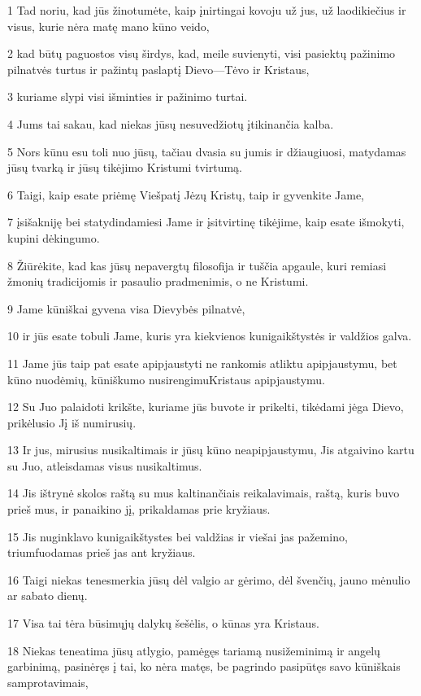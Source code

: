 \par 1 Tad noriu, kad jūs žinotumėte, kaip įnirtingai kovoju už jus, už laodikiečius ir visus, kurie nėra matę mano kūno veido, 
\par 2 kad būtų paguostos visų širdys, kad, meile suvienyti, visi pasiektų pažinimo pilnatvės turtus ir pažintų paslaptį Dievo—Tėvo ir Kristaus, 
\par 3 kuriame slypi visi išminties ir pažinimo turtai. 
\par 4 Jums tai sakau, kad niekas jūsų nesuvedžiotų įtikinančia kalba. 
\par 5 Nors kūnu esu toli nuo jūsų, tačiau dvasia su jumis ir džiaugiuosi, matydamas jūsų tvarką ir jūsų tikėjimo Kristumi tvirtumą. 
\par 6 Taigi, kaip esate priėmę Viešpatį Jėzų Kristų, taip ir gyvenkite Jame, 
\par 7 įsišakniję bei statydindamiesi Jame ir įsitvirtinę tikėjime, kaip esate išmokyti, kupini dėkingumo. 
\par 8 Žiūrėkite, kad kas jūsų nepavergtų filosofija ir tuščia apgaule, kuri remiasi žmonių tradicijomis ir pasaulio pradmenimis, o ne Kristumi. 
\par 9 Jame kūniškai gyvena visa Dievybės pilnatvė, 
\par 10 ir jūs esate tobuli Jame, kuris yra kiekvienos kunigaikštystės ir valdžios galva. 
\par 11 Jame jūs taip pat esate apipjaustyti ne rankomis atliktu apipjaustymu, bet kūno nuodėmių, kūniškumo nusirengimu­Kristaus apipjaustymu. 
\par 12 Su Juo palaidoti krikšte, kuriame jūs buvote ir prikelti, tikėdami jėga Dievo, prikėlusio Jį iš numirusių. 
\par 13 Ir jus, mirusius nusikaltimais ir jūsų kūno neapipjaustymu, Jis atgaivino kartu su Juo, atleisdamas visus nusikaltimus. 
\par 14 Jis ištrynė skolos raštą su mus kaltinančiais reikalavimais, raštą, kuris buvo prieš mus, ir panaikino jį, prikaldamas prie kryžiaus. 
\par 15 Jis nuginklavo kunigaikštystes bei valdžias ir viešai jas pažemino, triumfuodamas prieš jas ant kryžiaus. 
\par 16 Taigi niekas tenesmerkia jūsų dėl valgio ar gėrimo, dėl švenčių, jauno mėnulio ar sabato dienų. 
\par 17 Visa tai tėra būsimųjų dalykų šešėlis, o kūnas yra Kristaus. 
\par 18 Niekas teneatima jūsų atlygio, pamėgęs tariamą nusižeminimą ir angelų garbinimą, pasinėręs į tai, ko nėra matęs, be pagrindo pasipūtęs savo kūniškais samprotavimais, 
